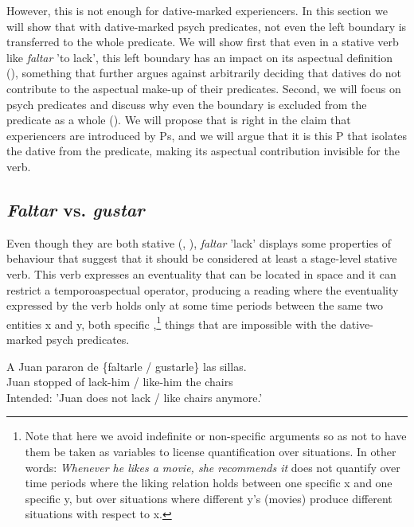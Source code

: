 \documentclass[output=paper,colorlinks,citecolor=brown,nonflat]{./langscibook}
\begin{document}
However, this is not enough for dative-marked experiencers. In this section we will show that with dative-marked psych predicates, not even the left boundary is transferred to the whole predicate. We will show first that even in a stative verb like \textit{faltar} 'to lack', this left boundary has an impact on its aspectual definition (), something that further argues against arbitrarily deciding that datives do not contribute to the aspectual make-up of their predicates. Second, we will focus on psych predicates and discuss why even the boundary is excluded from the predicate as a whole (). We will propose that \citet{Landau2010} is right in the claim that experiencers are introduced by Ps, and we will argue that it is this P that isolates the dative from the predicate, making its aspectual contribution invisible for the verb.

\subsection{\textit{Faltar} vs. \textit{gustar}}\label{sec:fabregas:3.1}

Even though they are both stative (, \citealt{GarcíaFernándezGutiérrezBergarecheMartinez2006}), \textit{faltar} {}'lack' displays some properties of behaviour that suggest that it should be considered at least a stage-level stative verb. This verb expresses an eventuality that can be located in space  and it can restrict a temporoaspectual operator, producing a reading where the eventuality expressed by the verb holds only at some time periods between the same two entities x and y, both specific \citet[cf. 27]{Kratzer1995},\footnote{Note that here we avoid indefinite or non-specific arguments so as not to have them be taken as variables to license quantification over situations. In other words: \textit{Whenever he likes a movie, she recommends it} does not quantify over time periods where the liking relation holds between one specific x and one specific y, but over situations where different y's (movies) produce different situations with respect to x.} things that are impossible with the dative-marked psych predicates.

\ea%
    \label{ex:fabregas:25}
    \gll    *A Juan  pararon de \{faltarle / gustarle\} las  sillas.\\
             {Juan} {stopped} {of}   {lack-him} {/} {like-him} {the} {chairs}\\
    \glt    Intended: 'Juan does not lack / like chairs anymore.'
    \z
\end{document}
